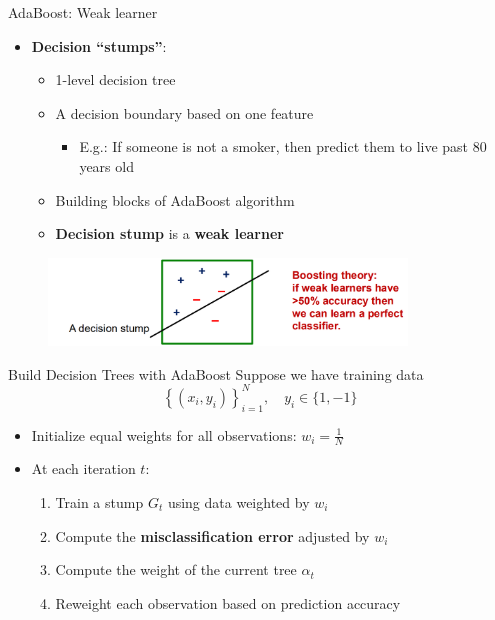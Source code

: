 
\begin{frame}{AdaBoost: Weak learner}
\begin{itemize}
    \item \textbf{Decision ``stumps''}:
    \begin{itemize}
        \item 1-level decision tree
        \item A decision boundary based on one feature
        \begin{itemize}
            \item E.g.: If someone is not a smoker, then predict them to live past 80 years old
        \end{itemize}
        \item Building blocks of AdaBoost algorithm
        \item \textbf{Decision stump} is a \textbf{weak learner}
    \end{itemize}
\end{itemize}

\begin{figure}[h]
    \centering
    \includegraphics[width=0.85\textwidth]{images/decision-trees/decision-trees-16.png}
\end{figure}

\end{frame}


\begin{frame}{Build Decision Trees with AdaBoost}
Suppose we have training data 
\[
\left\{ (x_i, y_i) \right\}_{i=1}^N, \quad y_i \in \{1, -1\}
\]

\begin{itemize}
    \item Initialize equal weights for all observations: \quad \( w_i = \frac{1}{N} \)

    \item At each iteration \( t \):
    \begin{enumerate}
        \item Train a stump \( G_t \) using data weighted by \( w_i \)
        \item Compute the \textbf{misclassification error} adjusted by \( w_i \)
        \item Compute the weight of the current tree \( \alpha_t \)
        \item Reweight each observation based on prediction accuracy
    \end{enumerate}
\end{itemize}
\end{frame}


